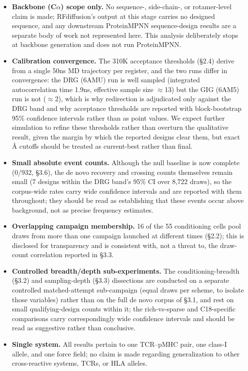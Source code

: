\documentclass[letterpaper]{article}
\begin{document}
\begin{itemize}
\item \textbf{Backbone (C$\alpha$) scope only.} No sequence-, side-chain-, or rotamer-level claim is made;
RFdiffusion's output at this stage carries no designed sequence, and any downstream ProteinMPNN
sequence-design results are a separate body of work not represented here. This analysis deliberately stops
at backbone generation and does not run ProteinMPNN.
\item \textbf{Calibration convergence.} The 310K acceptance thresholds (\S2.4) derive from a single 50ns
MD trajectory per register, and the two runs differ in convergence: the DRG (6AMU) run is well sampled
(integrated autocorrelation time 1.9ns, effective sample size $\approx$13) but the GIG (6AM5) run is not
($\approx$2), which is why redirection is adjudicated only against the DRG band and why acceptance
thresholds are reported with block-bootstrap 95\% confidence intervals rather than as point values. We expect
further simulation to refine these thresholds rather than overturn the qualitative result, given the
margin by which the reported designs clear them, but exact \AA{} cutoffs should be treated as current-best
rather than final.
\item \textbf{Small absolute event counts.} Although the null baseline is now complete (0/932, \S3.6), the
de novo recovery and crossing counts themselves remain small (7 designs within the DRG band's 95\% CI over
8{,}722 draws), so the corpus-wide rates carry wide confidence intervals and are reported with them
throughout; they should be read as establishing that these events occur above background, not as precise
frequency estimates.
\item \textbf{Overlapping campaign membership.} 16 of the 55 conditioning cells pool draws from more than
one campaign launched at different times (\S2.2); this is disclosed for transparency and is consistent
with, not a threat to, the draw-count correlation reported in \S3.3.
\item \textbf{Controlled breadth/depth sub-experiments.} The conditioning-breadth (\S3.2) and
sampling-depth (\S3.3) dissections are conducted on a separate controlled matched-attempt sub-campaign
(equal draws per scheme, to isolate those variables) rather than on the full de novo corpus of \S3.1, and
rest on small qualifying-design counts within it; the rich-vs-sparse and C18-specific comparisons carry
correspondingly wide confidence intervals and should be read as suggestive rather than conclusive.
\item \textbf{Single system.} All results pertain to one TCR--pMHC pair, one class-I allele, and one force
field; no claim is made regarding generalization to other cross-reactive systems, TCRs, or HLA alleles.
\end{itemize}
\end{document}
